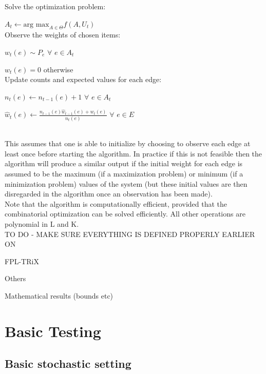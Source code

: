 Solve the optimization problem:

\indent \indent $A_t \leftarrow \textrm{arg max}_{A\in \Theta}f(A,U_t)$\\

Observe the weights of chosen items:

\indent \indent $w_t(e) \sim P_e$ $\forall$ $e \in A_t$

\indent \indent $w_t(e)=0$ otherwise\\

Update counts and expected values for each edge:

\indent \indent $n_t(e) \leftarrow n_{t-1}(e) + 1$ $\forall$ $e \in A_t$

\indent \indent $\hat{w}_t(e) \leftarrow \frac{n_{t-1}(e)\hat{w}_{t-1}(e)+w_t(e)}{n_t(e)}$ $\forall$ $e \in E$

\noindent \hrulefill\\

This assumes that one is able to initialize by choosing to observe each edge at least once before starting the algorithm. In practice if this is not feasible then the algorithm will produce a similar output if the initial weight for each edge is assumed to be the maximum (if a maximization problem) or minimum (if a minimization problem) values of the system (but these initial values are then disregarded in the algorithm once an observation has been made).\\

Note that the algorithm is computationally efficient, provided that the combinatorial optimization can be solved efficiently. All other operations are polynomial in L and K.\\

TO DO - MAKE SURE EVERYTHING IS DEFINED PROPERLY EARLIER ON


FPL-TRiX

Others

Mathematical results (bounds etc)	


\pagebreak


\section{Basic Testing}

\subsection{Basic stochastic setting}

